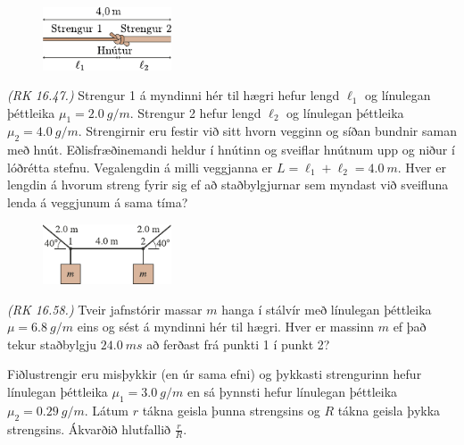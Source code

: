 \ifdefined \wholebook \else\documentclass[oneside]{book}\usepackage{EdlBook}\graphicspath{{figures/}}
\begin{document}
\begin{enumerate}[label = \textbf{Dæmi \thechapter.\arabic*.}]
\begin{minipage}{\linewidth}

\begin{figure}
\vspace{-0.5cm}
\includegraphics[width = 1.5in]{figures/strengur12.pdf}
\end{figure}

\item \textit{(RK 16.47.)} Strengur 1 á myndinni hér til hægri hefur lengd $\ell_1$ og línulegan þéttleika $\mu_1 = \SI{2.0}{g/m}$. Strengur 2 hefur lengd $\ell_2$ og línulegan þéttleika $\mu_2 = \SI{4.0}{g/m}$. Strengirnir eru festir við sitt hvorn vegginn og síðan bundnir saman með hnút. Eðlisfræðinemandi heldur í hnútinn og sveiflar hnútnum upp og niður í lóðrétta stefnu. Vegalengdin á milli veggjanna er $L = \ell_1 + \ell_2 = \SI{4.0}{m}$. Hver er lengdin á hvorum streng fyrir sig ef að staðbylgjurnar sem myndast við sveifluna lenda á veggjunum á sama tíma?
\end{minipage}

\begin{minipage}{\linewidth}
\begin{figure}
\vspace{-1cm}
\includegraphics[width = 1.5in]{figures/hanger.pdf}
\end{figure}

\item \textit{(RK 16.58.)} Tveir jafnstórir massar $m$ hanga í stálvír með línulegan þéttleika $\mu = \SI{6.8}{g/m}$ eins og sést á myndinni hér til hægri. Hver er massinn $m$ ef það tekur staðbylgju $\SI{24.0}{ms}$ að ferðast frá punkti 1 í punkt 2?
\end{minipage}

\item Fiðlustrengir eru misþykkir (en úr sama efni) og þykkasti strengurinn hefur línulegan þéttleika $\mu_{1} = \SI{3.0}{g/m}$ en sá þynnsti hefur línulegan þéttleika $\mu_{2} = \SI{0.29}{g/m}$. Látum $r$ tákna geisla þunna strengsins og $R$ tákna geisla þykka strengsins. Ákvarðið hlutfallið $\frac{r}{R}$.



\end{enumerate}
\end{document}
